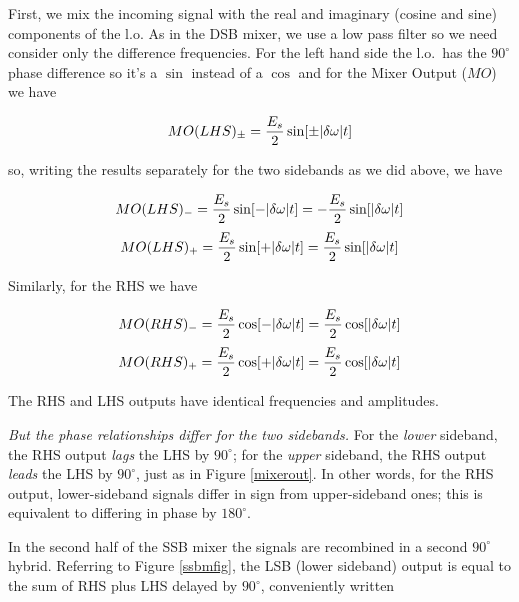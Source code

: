 \documentclass[11pt,preprint]{aastex}
\begin{document}
        First, we mix the incoming signal with the real and imaginary
(cosine and sine) components of the l.o. As in the DSB mixer, we use a
low pass filter so we need consider only the difference frequencies. For
the left hand side the l.o.\ has the $90^\circ$ phase difference so it's
a $\sin$ instead of a $\cos$ and for the Mixer Output ($MO$) we have

\begin{equation}
MO(LHS)_\pm = {E_s \over 2} \sin [\pm|\delta \omega | t]
\end{equation}

\noindent so, writing the results separately for the two sidebands as we
did above, we have

\begin{mathletters} \label{rhs}
\begin{equation}
MO(LHS)_- = {E_s \over 2} \sin [-|\delta \omega | t] =
   -{E_s \over 2} \sin [|\delta \omega | t]
\end{equation}
\begin{equation}
MO(LHS)_+ = {E_s \over 2} \sin [+|\delta \omega | t] =
   {E_s \over 2} \sin [|\delta \omega | t]
\end{equation}
\end{mathletters}

\noindent Similarly, for the RHS we have

\begin{mathletters} \label{lhs}
\begin{equation}
MO(RHS)_- = {E_s \over 2} \cos [-|\delta \omega | t] =
   {E_s \over 2} \cos [|\delta \omega | t]
\end{equation}
\begin{equation}
MO(RHS)_+ = {E_s \over 2} \cos [+|\delta \omega | t] =
   {E_s \over 2} \cos [|\delta \omega | t]
\end{equation}
\end{mathletters}

\noindent The RHS and LHS outputs have identical frequencies and
amplitudes.


        {\it But the phase relationships differ for the two sidebands.}
For the {\it lower} sideband, the RHS output {\it lags} the LHS by
$90^\circ$; for the {\it upper} sideband, the RHS output {\it leads} the
LHS by $90^\circ$, just as in Figure \ref{mixerout}. In other words, for
the RHS output, lower-sideband signals differ in sign from
upper-sideband ones; this is equivalent to differing in phase by
$180^\circ$.

        In the second half of the SSB mixer the signals are recombined
in a second $90^\circ$ hybrid. Referring to Figure \ref{ssbmfig}, the
LSB (lower sideband) output is equal to the sum of RHS plus LHS delayed
by $90^\circ$, conveniently written
\end{document}

